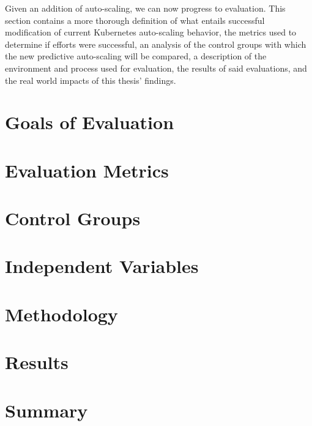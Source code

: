 Given an addition of auto-scaling, we can now progress to
evaluation. This section contains a more thorough definition of what entails
successful modification of current Kubernetes auto-scaling behavior, the metrics
used to determine if efforts were successful, an analysis of the control groups
with which the new predictive auto-scaling will be compared, a description of
the environment and process used for evaluation, the results of said
evaluations, and the real world impacts of this thesis' findings.

\section{Goals of Evaluation}



\section{Evaluation Metrics}



\section{Control Groups}



\section{Independent Variables}



\section{Methodology}



\section{Results}
\label{evaluation-results}



\section{Summary}


